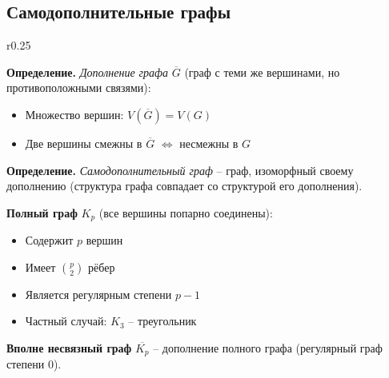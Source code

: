 \subsection{Самодополнительные графы}

\begin{wrapfigure}{r}{0.25\textwidth}
\end{wrapfigure}

\noindent\textbf{Определение.} \textit{Дополнение графа} $\overline{G}$ (граф с теми же вершинами, но противоположными связями):
\begin{itemize}[noitemsep,topsep=0pt]
\item Множество вершин: $V(\overline{G}) = V(G)$
\item Две вершины смежны в $\overline{G}$ $\Leftrightarrow$ несмежны в $G$
\end{itemize}

\noindent\textbf{Определение.} \textit{Самодополнительный граф} -- граф, изоморфный своему дополнению (структура графа совпадает со структурой его дополнения).

\noindent\textbf{Полный граф} $K_p$ (все вершины попарно соединены):
\begin{itemize}[noitemsep,topsep=0pt]
\item Содержит $p$ вершин
\item Имеет $\binom{p}{2}$ рёбер
\item Является регулярным степени $p-1$
\item Частный случай: $K_3$ -- треугольник
\end{itemize}

\noindent\textbf{Вполне несвязный граф} $\overline{K_p}$ -- дополнение полного графа (регулярный граф степени 0).